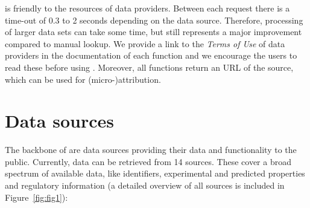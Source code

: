 \documentclass[article]{jss}
\begin{document}
 is friendly to the resources of data providers.  Between
each request there is a time-out of 0.3 to 2 seconds depending on the
data source.  Therefore, processing of larger data sets can take some
time, but still represents a major improvement compared to manual
lookup.  We provide a link to the \emph{Terms of Use} of data
providers in the documentation of each function and we encourage the
users to read these before using .  Moreover, all
functions return an URL of the source, which can be used for
\mbox{(micro-)attribution}.


\section[Data sources]{Data sources}\label{sec:data-sources}
The backbone of  are data sources providing their data
and functionality to the public.  Currently, data can be retrieved
from 14 sources.  These cover a broad spectrum of available data, like
identifiers, experimental and predicted properties and regulatory
information (a detailed overview of all sources is included in
Figure~\ref{fig:fig1}):
\end{document}
